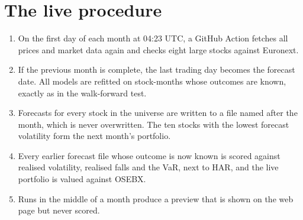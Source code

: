 \documentclass[11pt,a4paper]{article}
\begin{document}
\section{The live procedure}
\begin{enumerate}
\item On the first day of each month at 04:23 UTC, a GitHub Action fetches all prices and market data again and checks eight large stocks against Euronext.
\item If the previous month is complete, the last trading day becomes the forecast date. All models are refitted on stock-months whose outcomes are known, exactly as in the walk-forward test.
\item Forecasts for every stock in the universe are written to a file named after the month, which is never overwritten. The ten stocks with the lowest forecast volatility form the next month's portfolio.
\item Every earlier forecast file whose outcome is now known is scored against realised volatility, realised falls and the VaR, next to HAR, and the live portfolio is valued against OSEBX.
\item Runs in the middle of a month produce a preview that is shown on the web page but never scored.
\end{enumerate}
\end{document}
